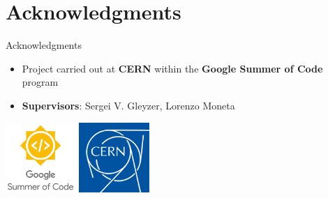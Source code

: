 \documentclass{beamer}
\begin{document}
\section{Acknowledgments}
\begin{frame}{Acknowledgments}
  \begin{itemize}
  \item Project carried out at \textbf{CERN} within the \textbf{Google Summer of Code}
    program
  \item \textbf{Supervisors}: Sergei V. Gleyzer, Lorenzo Moneta
  \end{itemize}
    \begin{center}
\includegraphics[width=0.2\textwidth]{gsoc}%
\hskip 2cm \includegraphics[width=0.2\textwidth]{cern}
   \end{center}
\end{frame}
\end{document}
